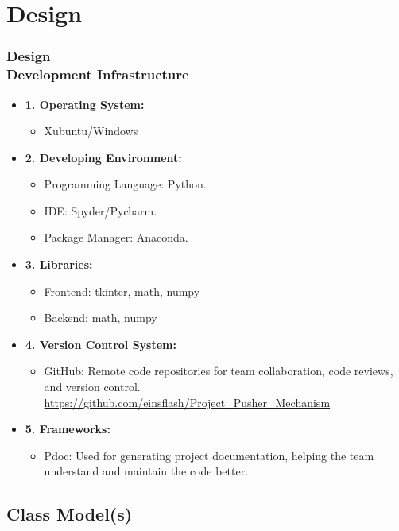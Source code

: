 \documentclass[ucs,10pt]{beamer}
\begin{document}
\section{Design}

\begin{frame}
	\frametitle{Design \\
		\small \color{rwth-blue} Development Infrastructure}
	\begin{itemize}
		\item \textbf{1. Operating System:}
		\begin{itemize}
			\item Xubuntu/Windows
		\end{itemize}
		\item \textbf{2. Developing Environment:}
		\begin{itemize}
			\item Programming Language: Python.
			\item IDE: Spyder/Pycharm.
			\item Package Manager: Anaconda.
		\end{itemize}
		\item \textbf{3. Libraries:}
		\begin{itemize}
			\item Frontend: tkinter, math, numpy
			\item Backend: math, numpy
		\end{itemize}
		\item \textbf{4. Version Control System:}
		\begin{itemize}
			\item GitHub: Remote code repositories for team collaboration, code reviews, and version control. \url{https://github.com/einsflash/Project_Pusher_Mechanism}
		\end{itemize}
		\item \textbf{5. Frameworks:}
		\begin{itemize}
			\item Pdoc: Used for generating project documentation, helping the team understand and maintain the code better.
		\end{itemize}
	\end{itemize}
\end{frame}

\subsection{Class Model(s)}
\end{document}
